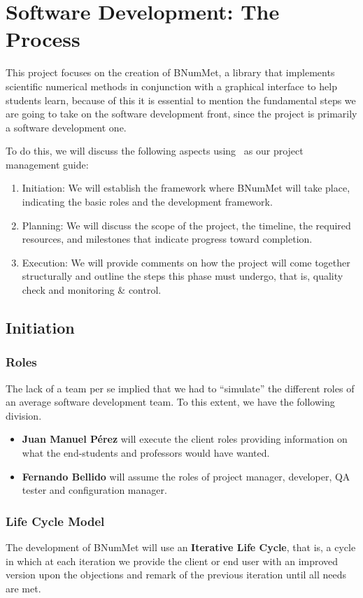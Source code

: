 \chapter{Software Development: The Process}
This project focuses on the creation of BNumMet, a library that implements scientific numerical methods in conjunction with a graphical interface to help students learn, because of this it is essential to mention the fundamental steps we are going to take on the software development front, since the project is primarily a software development one. 

To do this, we will discuss the following aspects using~\cite{PMBOK2013} as our project management guide:
\begin{enumerate}
    \item Initiation: We will establish the framework where BNumMet will take place, indicating the basic roles and the development framework.
    \item Planning: We will discuss the scope of the project, the timeline, the required resources, and milestones that indicate progress toward completion.
    \item Execution: We will provide comments on how the project will come together structurally and outline the steps this phase must undergo, that is, quality check and monitoring \& control.
\end{enumerate}


\section{Initiation}
\subsection{Roles}
The lack of a team per se implied that we had to ``simulate'' the different roles of an average software development team.
To this extent, we have the following division.
\begin{itemize}
    \item \textbf{Juan Manuel Pérez} will execute the client roles providing information on what the end-students and professors would have wanted.
    \item \textbf{Fernando Bellido} will assume the roles of project manager, developer, QA tester and configuration manager.
\end{itemize}

\subsection{Life Cycle Model}
The development of BNumMet will use an \textbf{Iterative Life Cycle}, that is, a cycle in which at each iteration we provide the client or end user with an improved version upon the objections and remark of the previous iteration until all needs are met.

